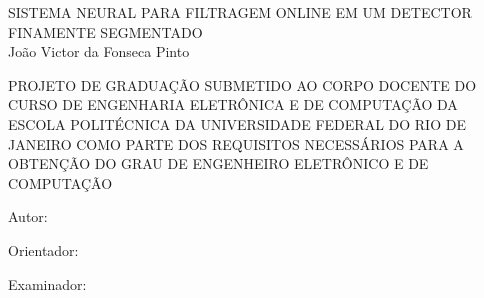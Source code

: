 \pagebreak


\begin{center}
\large{SISTEMA NEURAL PARA FILTRAGEM ONLINE EM UM DETECTOR FINAMENTE SEGMENTADO}\\
   \vspace{0.4cm}
\large{João Victor da Fonseca Pinto}\\
\end{center}
   \vspace{0.4cm}
PROJETO DE GRADUAÇÃO SUBMETIDO AO CORPO DOCENTE DO CURSO DE ENGENHARIA ELETRÔNICA E DE COMPUTAÇÃO DA ESCOLA POLITÉCNICA DA UNIVERSIDADE FEDERAL DO RIO DE JANEIRO COMO PARTE DOS REQUISITOS NECESSÁRIOS PARA A OBTENÇÃO DO GRAU DE ENGENHEIRO ELETRÔNICO E DE COMPUTAÇÃO   
   
   \vspace{0.5cm}
Autor:
      \vspace{0.35cm}
      \begin{flushright}
         \parbox{10cm}{
            \hrulefill

            \vspace{-.375cm}

            \vspace{0.08cm}
         }
      \end{flushright}
      
      
Orientador:
      \vspace{0.35cm}
      \begin{flushright}
         \parbox{10cm}{
            \hrulefill

            \vspace{-.375cm}

            \vspace{0.08cm}
         }
      \end{flushright}
      

      
Examinador:
      \vspace{0.35cm}
      \begin{flushright}
         \parbox{10cm}{
            \hrulefill

            \vspace{-.375cm}

            \vspace{0.08cm}
         }
      \end{flushright}
      
